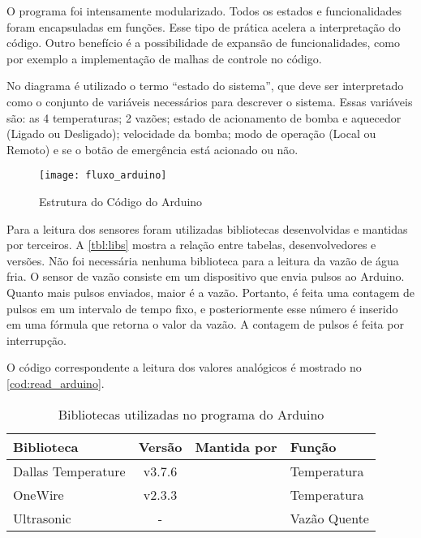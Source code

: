 			O programa foi intensamente modularizado. Todos os estados e funcionalidades foram encapsuladas em funções. Esse tipo de prática acelera a interpretação do código. Outro benefício é a possibilidade de expansão de funcionalidades, como por exemplo a implementação de malhas de controle no código. 
				
			No diagrama é utilizado o termo ``estado do sistema'', que deve ser interpretado como o conjunto de variáveis necessários para descrever o sistema. Essas variáveis são: as 4 temperaturas; 2 vazões; estado de acionamento de bomba e aquecedor (Ligado ou Desligado); velocidade da bomba; modo de operação (Local ou Remoto) e se o botão de emergência está acionado ou não.
			
			\begin{figure}[!htb]	
					\captionsetup{justification=centering}
					\begin{center}
						\texttt{[image: fluxo\_arduino]}  %
						\caption[Estrutura do Código do Arduino]{\label{fig:fluxo_arduino} Estrutura do Código do Arduino }
					\end{center}		
			\end{figure}
			
			Para a leitura dos sensores foram utilizadas bibliotecas desenvolvidas e mantidas por terceiros. A \autoref{tbl:libs} mostra a relação entre tabelas, desenvolvedores e versões. Não foi necessária nenhuma biblioteca para a leitura da vazão de água fria. O sensor de vazão consiste em um dispositivo que envia pulsos ao Arduino. Quanto mais pulsos enviados, maior é a vazão. Portanto, é feita uma contagem de pulsos em um intervalo de tempo fixo, e posteriormente esse número é inserido em uma fórmula que retorna o valor da vazão. A contagem de pulsos é feita por interrupção.
			
			O código correspondente a leitura dos valores analógicos é mostrado no \autoref{cod:read_arduino}.
			
			\begin{table}[!htb]
				\centering
				\captionsetup{justification=centering}
				\caption[Bibliotecas utilizadas no programa do Arduino]{Bibliotecas utilizadas no programa do Arduino}
				\label{tbl:libs}
				\def\arraystretch{1.3}
				\begin{tabular}{l c l l}
					\hline
					\textbf{Biblioteca} & \textbf{Versão}& \textbf{Mantida por} & \textbf{Função} \\ \hline
					Dallas Temperature & v3.7.6 & \textcite{miles2016} & Temperatura \\
					OneWire & v2.3.3 & \textcite{paul2017} & Temperatura \\
					Ultrasonic & - & \textcite{filipeflop2011} & Vazão Quente \\					
					\hline
				\end{tabular}
			\end{table}
		
